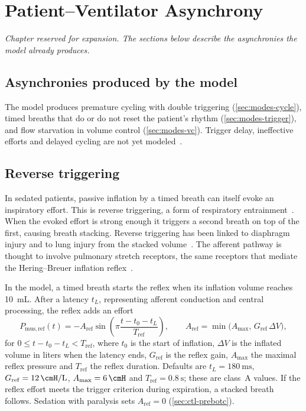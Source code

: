 \chapter{Patient--Ventilator Asynchrony}
\label{ch:async}

\begin{authornote}
\emph{Chapter reserved for expansion. The sections below describe the asynchronies the model already produces.}
\end{authornote}

\section{Asynchronies produced by the model}
The model produces premature cycling with double triggering (\cref{sec:modes-cycle}), timed breaths that do or do not reset the patient's rhythm (\cref{sec:modes-trigger}), and flow starvation in volume control (\cref{sec:modes-vc}). Trigger delay, ineffective efforts and delayed cycling are not yet modeled~\citep{tobin2001,thille2006}.

\section{Reverse triggering}
\label{sec:async-reverse}
In sedated patients, passive inflation by a timed breath can itself evoke an inspiratory effort. This is reverse triggering, a form of respiratory entrainment~\citep{akoumianaki2013a}. When the evoked effort is strong enough it triggers a second breath on top of the first, causing breath stacking. Reverse triggering has been linked to diaphragm injury and to lung injury from the stacked volume~\citep{dres2016}. The afferent pathway is thought to involve pulmonary stretch receptors, the same receptors that mediate the Hering--Breuer inflation reflex~\citep{graves1986}.

In the model, a timed breath starts the reflex when its inflation volume reaches \SI{10}{\milli\liter}. After a latency $t_L$, representing afferent conduction and central processing, the reflex adds an effort
\begin{equation}
P_{\mathrm{mus,ref}}(t)=-A_{\mathrm{ref}}\sin\!\left(\pi\frac{t-t_0-t_L}{T_{\mathrm{ref}}}\right),\qquad
A_{\mathrm{ref}}=\min\bigl(A_{\max},\,G_{\mathrm{ref}}\,\Delta V\bigr),
\label{eq:async-reflex}
\end{equation}
for $0\le t-t_0-t_L<T_{\mathrm{ref}}$, where $t_0$ is the start of inflation, $\Delta V$ is the inflated volume in liters when the latency ends, $G_{\mathrm{ref}}$ is the reflex gain, $A_{\max}$ the maximal reflex pressure and $T_{\mathrm{ref}}$ the reflex duration. Defaults are $t_L=\SI{180}{\milli\second}$, $G_{\mathrm{ref}}=\SI{12}{\cmH\per\liter}$, $A_{\max}=\SI{6}{\cmH}$ and $T_{\mathrm{ref}}=\SI{0.8}{\second}$; these are class~A values. If the reflex effort meets the trigger criterion during expiration, a stacked breath follows. Sedation with paralysis sets $A_{\mathrm{ref}}=0$ (\cref{sec:ctl-prebotc}).
